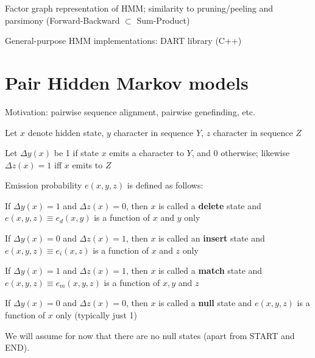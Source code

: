 \documentclass{beamer}
\begin{document}
\begin{frame}{}
\itemb
\item Factor graph representation of HMM; similarity to pruning/peeling and parsimony (Forward-Backward $\subset$ Sum-Product)
\item General-purpose HMM implementations: DART library (C++)
\iteme

\end{frame}

\section{Pair Hidden Markov models}

\begin{frame}{}

\itemb
\item Motivation: pairwise sequence alignment, pairwise genefinding, etc.
\item Let $x$ denote hidden state, $y$ character in sequence $Y$, $z$ character in sequence $Z$
\item Let $\Delta y(x)$ be 1 if state $x$ emits a character to $Y$, and 0 otherwise; likewise $\Delta z(x)=1$ iff $x$ emits to $Z$
\iteme
\end{frame}

\begin{frame}{}
\itemb
\item Emission probability $e(x,y,z)$ is defined as follows:
 \itemb
 \item If $\Delta y(x)=1$ and $\Delta z(x)=0$, then $x$ is called a {\bf delete} state and $e(x,y,z) \equiv e_d(x,y)$ is a function of $x$ and $y$ only
 \item If $\Delta y(x)=0$ and $\Delta z(x)=1$, then $x$ is called an {\bf insert} state and $e(x,y,z) \equiv e_i(x,z)$ is a function of $x$ and $z$ only
 \item If $\Delta y(x)=1$ and $\Delta z(x)=1$, then $x$ is called a {\bf match} state and $e(x,y,z) \equiv e_m(x,y,z)$ is a function of $x,y$ and $z$
 \item If $\Delta y(x)=0$ and $\Delta z(x)=0$, then $x$ is called a {\bf null} state and $e(x,y,z)$ is a function of $x$ only (typically just 1)
 \item We will assume for now that there are no null states
 (apart from START and END).
 \iteme
\iteme

\end{frame}
\end{document}
